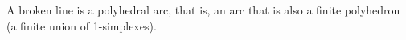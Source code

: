 A broken line is a polyhedral arc, that is, an arc that is also a finite polyhedron (a finite union of 1-simplexes).
